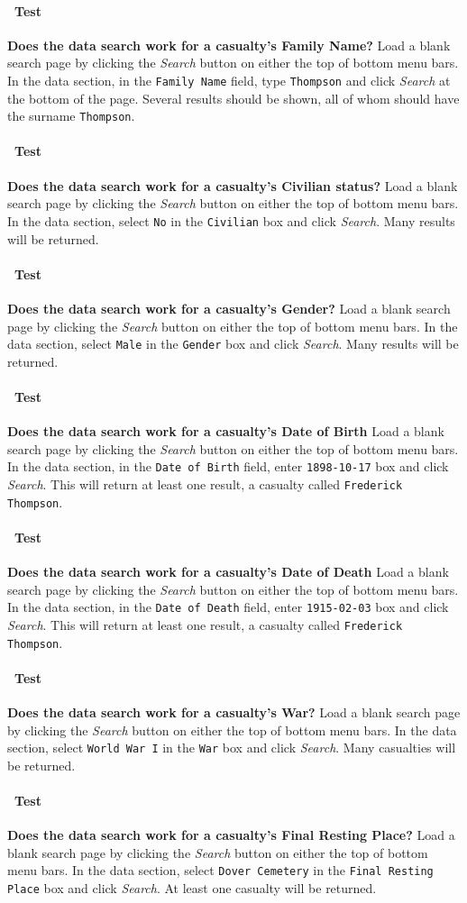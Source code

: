 \documentclass[12pt]{article}
\newcounter{Test}
\newcommand{\test}[1]{%
\stepcounter{Test}%
\paragraph{\Circle\ Test \theTest} \textbf{#1} }
\begin{document}
\test{Does the data search work for a casualty's Family Name?}
Load a blank search page by clicking the \textit{Search} button on either the top of bottom menu bars. In the data section, in the \texttt{Family Name} field, type \texttt{Thompson} and click \textit{Search} at the bottom of the page. Several results should be shown, all of whom should have the surname \texttt{Thompson}.

\test{Does the data search work for a casualty's Civilian status?}
Load a blank search page by clicking the \textit{Search} button on either the top of bottom menu bars. In the data section, select \texttt{No} in the \texttt{Civilian} box and click \textit{Search}. Many results will be returned.

\test{Does the data search work for a casualty's Gender?}
Load a blank search page by clicking the \textit{Search} button on either the top of bottom menu bars. In the data section, select \texttt{Male} in the \texttt{Gender} box and click \textit{Search}. Many results will be returned.

\test{Does the data search work for a casualty's Date of Birth}
Load a blank search page by clicking the \textit{Search} button on either the top of bottom menu bars. In the data section, in the \texttt{Date of Birth} field, enter \texttt{1898-10-17} box and click \textit{Search}. This will return at least one result, a casualty called \texttt{Frederick Thompson}.

\test{Does the data search work for a casualty's Date of Death}
Load a blank search page by clicking the \textit{Search} button on either the top of bottom menu bars. In the data section, in the \texttt{Date of Death} field, enter \texttt{1915-02-03} box and click \textit{Search}. This will return at least one result, a casualty called \texttt{Frederick Thompson}.

\test{Does the data search work for a casualty's War?}
Load a blank search page by clicking the \textit{Search} button on either the top of bottom menu bars. In the data section, select \texttt{World War I} in the \texttt{War} box and click \textit{Search}. Many casualties will be returned.

\test{Does the data search work for a casualty's Final Resting Place?}
Load a blank search page by clicking the \textit{Search} button on either the top of bottom menu bars. In the data section, select \texttt{Dover Cemetery} in the \texttt{Final Resting Place} box and click \textit{Search}. At least one casualty will be returned.
\end{document}
